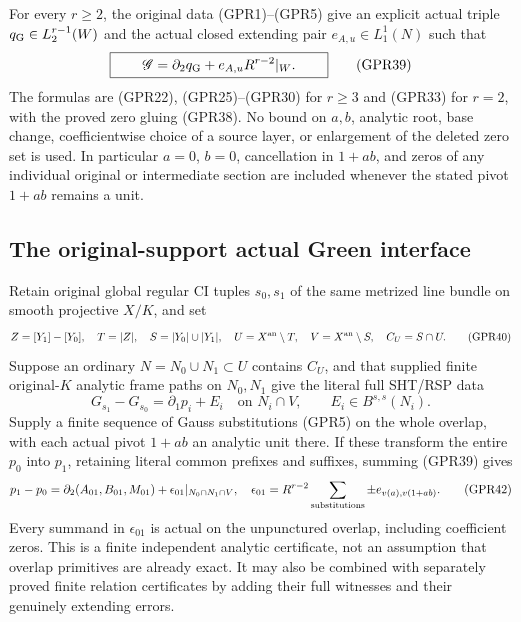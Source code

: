 \begin{theorem}
For every $r\ge2$, the original data (GPR1)--(GPR5) give an
explicit actual triple $q_{\rm G}\in L_2^{r-1}(W)$ and the actual
closed extending pair $e_{A,u}\in L_1^1(N)$ such that
\[
 \boxed{\qquad
 \mathscr G=\partial_2q_{\rm G}+e_{A,u}R^{r-2}|_W.
 \qquad}
 \tag{GPR39}
\]
The formulas are (GPR22), (GPR25)--(GPR30) for $r\ge3$ and
(GPR33) for $r=2$, with the proved zero gluing (GPR38).
No bound on $a,b$, analytic root, base change, coefficientwise
choice of a source layer, or enlargement of the deleted zero set
is used.  In particular $a=0$, $b=0$, cancellation in $1+ab$,
and zeros of any individual original or intermediate section
are included whenever the stated pivot $1+ab$ remains a unit.
\end{theorem}

\subsection{The original-support actual Green interface}

Retain original global regular CI tuples $s_0,s_1$ of the same
metrized line bundle on smooth projective $X/K$, and set
\[
 Z=[Y_1]-[Y_0],\quad T=|Z|,\quad S=|Y_0|\cup|Y_1|,
 \quad U=X^{\rm an}\setminus T,\quad V=X^{\rm an}\setminus S,
 \quad C_U=S\cap U.
 \tag{GPR40}
\]
Suppose an ordinary $N=N_0\cup N_1\subset U$ contains $C_U$,
and that supplied finite original-$K$ analytic frame paths on
$N_0,N_1$ give the literal full SHT/RSP data
\[
 G_{s_1}-G_{s_0}=\partial_1p_i+E_i\quad\text{on }N_i\cap V,
 \qquad E_i\in B^{s,s}(N_i).
 \tag{GPR41}
\]
Supply a finite sequence of Gauss substitutions (GPR5) on the
whole overlap, with each actual pivot $1+ab$ an analytic unit
there.  If these transform the entire $p_0$ into $p_1$, retaining
literal common prefixes and suffixes, summing (GPR39) gives
\[
 p_1-p_0=\partial_2(A_{01},B_{01},M_{01})+\epsilon_{01}|_{N_0\cap N_1\cap V},
 \quad \epsilon_{01}=R^{r-2}\sum_{\rm substitutions}\pm e_{v(a),v(1+ab)}.
 \tag{GPR42}
\]
Every summand in $\epsilon_{01}$ is actual on the unpunctured
overlap, including coefficient zeros.  This is a finite independent
analytic certificate, not an assumption that overlap primitives
are already exact.  It may also be combined with separately
proved finite relation certificates by adding their full witnesses
and their genuinely extending errors.

